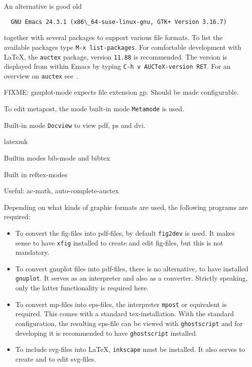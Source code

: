 An alternative is good old 
%
\begin{verbatim}
  GNU Emacs 24.3.1 (x86\_64-suse-linux-gnu, GTK+ Version 3.16.7)
\end{verbatim}
%
together with several packages to support 
various file formats. 
To list the available packages type 
\texttt{M-x list-packages}. 
For comfortable development with \LaTeX, 
the \texttt{auctex} package, version \texttt{11.88} is recommended. 
The version is displayed from within Emacs 
by typing \texttt{C-h v AUCTeX-version RET}. 
For an overview on \texttt{auctex} see~\cite{AucTeX}. 


FIXME\@: gnuplot-mode expects file extension gp. 
Should be made configurable. 

To edit metapost, the mode built-in mode \texttt{Metamode} is used. 

Built-in mode \texttt{Docview} to view pdf, ps and dvi. 

latexmk

Builtin modes bib-mode and bibtex

Built in reftex-modes

Useful: 
ac-math, auto-complete-auctex

Depending on what kinds of graphic formats are used, 
the following programs are required: 
%
\begin{itemize}
\item
To convert the \gls{fig}-files into \gls{pdf}-files, 
by default \texttt{fig2dev} is used. 
It makes sense to have \texttt{xfig} installed 
to create and edit fig-files, but this is not mandatory. 
\item
To convert gnuplot files into pdf-files, there is no alternative, 
to have installed \texttt{gnuplot}. 
It serves as an interpreter and also as a converter. 
Strictly speaking, only the latter functionality is required here. 
\item
To convert \gls{mp}-files into \gls{eps}-files, 
the interpreter \texttt{mpost} or equivalent is required. 
This comes with a standard tex-installation. 
With the standard configuration, 
the resulting eps-file can be viewed with \texttt{ghostscript} 
and for developing it is recommended to have \texttt{ghostscript} installed. 
\item
To include \gls{svg}-files into \LaTeX{}, 
\texttt{inkscape} must be installed. 
It also serves to create and to edit svg-files. 
\end{itemize}



